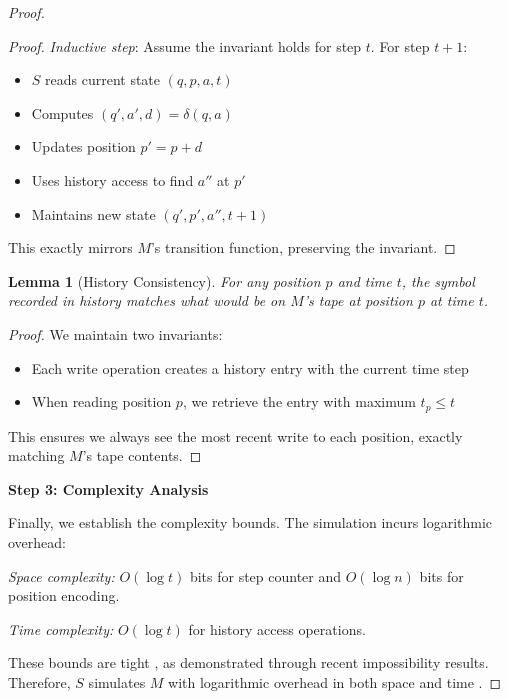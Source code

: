 \documentclass[12pt]{article}
\newtheorem{lemma}[theorem]{Lemma}
\begin{document}
\begin{proof}
\begin{proof}
\vspace{0.3em}
\noindent\textit{Inductive step}: Assume the invariant holds for step $t$. 
For step $t+1$: 
\begin{itemize}
    \item $S$ reads current state $(q, p, a, t)$
    \item Computes $(q', a', d) = \delta(q, a)$
    \item Updates position $p' = p + d$
    \item Uses history access to find $a''$ at $p'$
    \item Maintains new state $(q', p', a'', t+1)$
\end{itemize}
This exactly mirrors $M$'s transition function, preserving the invariant.
\end{proof}

\begin{lemma}[History Consistency]
For any position $p$ and time $t$, the symbol recorded in history matches what would be on $M$'s tape at position $p$ at time $t$.
\end{lemma}

\begin{proof}
We maintain two invariants:
\begin{itemize}
    \item Each write operation creates a history entry with the current time step
    \item When reading position $p$, we retrieve the entry with maximum $t_p \leq t$
\end{itemize}
This ensures we always see the most recent write to each position, exactly matching $M$'s tape contents.
\end{proof}

\vspace{0.5em}
\noindent\textbf{Step 3: Complexity Analysis}

Finally, we establish the complexity bounds. The simulation incurs logarithmic overhead:

\vspace{0.3em}
\noindent\textit{Space complexity:} $O(\log t)$ bits for step counter and $O(\log n)$ bits for position encoding.

\noindent\textit{Time complexity:} $O(\log t)$ for history access operations.

These bounds are tight \cite{parzych2024memory,hhan2024new,boyle2024memory}, as demonstrated through recent impossibility results. Therefore, $S$ simulates $M$ with logarithmic overhead in both space and time \cite{savage1994space,vonkorff2019molecular,bennett1989time}.
\end{proof}
\end{document}
